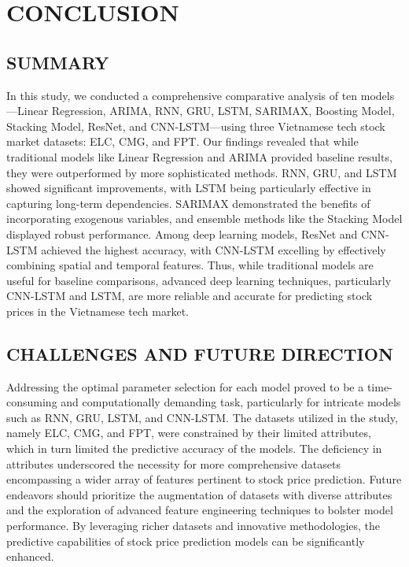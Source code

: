 \documentclass[conference]{IEEEtran}
\begin{document}
\section{CONCLUSION}
\subsection{SUMMARY}
In this study, we conducted a comprehensive comparative analysis of ten models—Linear Regression, ARIMA, RNN, GRU, LSTM, SARIMAX, Boosting Model, Stacking Model, ResNet, and CNN-LSTM—using three Vietnamese tech stock market datasets: ELC, CMG, and FPT. Our findings revealed that while traditional models like Linear Regression and ARIMA provided baseline results, they were outperformed by more sophisticated methods. RNN, GRU, and LSTM showed significant improvements, with LSTM being particularly effective in capturing long-term dependencies. SARIMAX demonstrated the benefits of incorporating exogenous variables, and ensemble methods like the Stacking Model displayed robust performance. Among deep learning models, ResNet and CNN-LSTM achieved the highest accuracy, with CNN-LSTM excelling by effectively combining spatial and temporal features. Thus, while traditional models are useful for baseline comparisons, advanced deep learning techniques, particularly CNN-LSTM and LSTM, are more reliable and accurate for predicting stock prices in the Vietnamese tech market. 

\subsection{CHALLENGES AND FUTURE DIRECTION}
Addressing the optimal parameter selection for each model proved to be a time-consuming and computationally demanding task, particularly for intricate models such as RNN, GRU, LSTM, and CNN-LSTM. The datasets utilized in the study, namely ELC, CMG, and FPT, were constrained by their limited attributes, which in turn limited the predictive accuracy of the models. The deficiency in attributes underscored the necessity for more comprehensive datasets encompassing a wider array of features pertinent to stock price prediction. Future endeavors should prioritize the augmentation of datasets with diverse attributes and the exploration of advanced feature engineering techniques to bolster model performance. By leveraging richer datasets and innovative methodologies, the predictive capabilities of stock price prediction models can be significantly enhanced.





\end{document}
